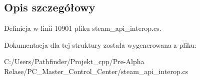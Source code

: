 \subsection{Opis szczegółowy}


Definicja w linii 10901 pliku steam\+\_\+api\+\_\+interop.\+cs.



Dokumentacja dla tej struktury została wygenerowana z pliku\+:\begin{DoxyCompactItemize}
\item 
C\+:/\+Users/\+Pathfinder/\+Projekt\+\_\+cpp/\+Pre-\/\+Alpha Relase/\+P\+C\+\_\+\+Master\+\_\+\+Control\+\_\+\+Center/steam\+\_\+api\+\_\+interop.\+cs\end{DoxyCompactItemize}
